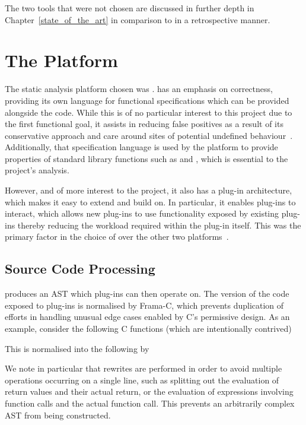 The two tools that were not chosen are discussed in further depth in Chapter~\ref{state_of_the_art} in comparison to  in a retrospective manner.

\section{The  Platform}

The static analysis platform chosen was .  has an emphasis on correctness, providing its own language for functional specifications which can be provided alongside the code. While this is of no particular interest to this project due to the first functional goal, it assists in reducing false positives as a result of its conservative approach and care around sites of potential undefined behaviour~\cite{framauser}. Additionally, that specification language is used by the platform to provide properties of standard library functions such as \malloc{} and \free{}, which is essential to the project's analysis.

However, and of more interest to the project, it also has a plug-in architecture, which makes it easy to extend and build on. In particular, it enables plug-ins to interact, which allows new plug-ins to use functionality exposed by existing plug-ins thereby reducing the workload required within the plug-in itself. This was the primary factor in the choice of  over the other two platforms~\cite{framaarch}.

\subsection{Source Code Processing}

 produces an AST which plug-ins can then operate on. The version of the code exposed to plug-ins is normalised by Frama-C, which prevents duplication of efforts in handling unusual edge cases enabled by C's permissive design. As an example, consider the following C functions (which are intentionally contrived)



This is normalised into the following by 



We note in particular that rewrites are performed in order to avoid multiple operations occurring on a single line, such as splitting out the evaluation of return values and their actual return, or the evaluation of expressions involving function calls and the actual function call. This prevents an arbitrarily complex AST from being constructed.

